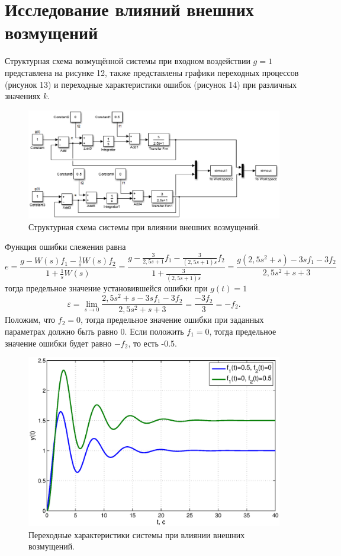 \documentclass[12pt,a4paper]{article}
\begin{document}
\section*{Исследование влияний внешних возмущений} 
Структурная схема возмущённой системы при входном воздействии $g=1$ представлена на рисунке 12, также представлены графики переходных процессов (рисунок 13) и переходные характеристики ошибок (рисунок 14) при различных значениях $k$.
\begin{figure}[H]
    \centering
    \includegraphics[width=0.8\linewidth]{cxema3.eps}
    \caption{Структурная схема системы при влиянии внешних возмущений.}
\end{figure}
Функция ошибки слежения равна
\begin{equation}
e = \frac{g - W(s)f_1 - \displaystyle{\frac{1}{s}}W(s)f_2}{1 + \displaystyle{\frac{1}{s}}W(s)} = \frac{g - \displaystyle{\frac{3}{2,5s + 1}}f_1 - \displaystyle{\frac{3}{(2,5s + 1)s}}f_2}{1 + \displaystyle{\frac{3}{(2,5s + 1)s}}} = \frac{g(2,5s^2 + s) - 3sf_1 - 3f_2}{2,5s^2 + s + 3}
\end{equation}
тогда предельное значение установившейся ошибки при $g(t) = 1$
\begin{equation}
\varepsilon = \lim_{s \to 0} \frac{2,5s^2 + s - 3sf_1 - 3f_2}{2,5s^2 + s + 3} = \frac{-3f_2}{3} = -f_2.
\end{equation}
Положим, что $f_2=0$, тогда предельное значение ошибки при заданных параметрах должно быть равно 0. Если положить  $f_1=0$, тогда предельное значение ошибки будет равно $-f_2$, то есть -0.5.
\begin{figure}[H]
    \centering
    \includegraphics[width=1\linewidth]{3.1.eps}
    \caption{Переходные характеристики системы при влиянии внешних возмущений.}
\end{figure}
\end{document}
